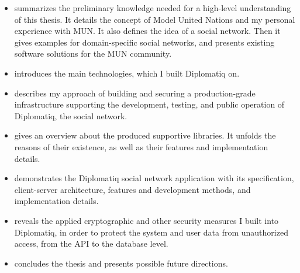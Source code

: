 \begin{itemize}
\item \emph{} summarizes the preliminary knowledge needed for a high-level understanding of this thesis. It details the concept of Model United Nations and my personal experience with MUN. It also defines the idea of a social network. Then it gives examples for domain-specific social networks, and presents existing software solutions for the MUN community.
\item \emph{} introduces the main technologies, which I built Diplomatiq on.
\item \emph{} describes my approach of building and securing a production-grade infrastructure supporting the development, testing, and public operation of Diplomatiq, the social network.
\item \emph{} gives an overview about the produced supportive libraries. It unfolds the reasons of their existence, as well as their features and implementation details.
\item \emph{} demonstrates the Diplomatiq social network application with its specification, client-server architecture, features and development methods, and implementation details.
\item \emph{} reveals the applied cryptographic and other security measures I built into Diplomatiq, in order to protect the system and user data from unauthorized access, from the API to the database level.
\item \emph{} concludes the thesis and presents possible future directions.
\end{itemize}
